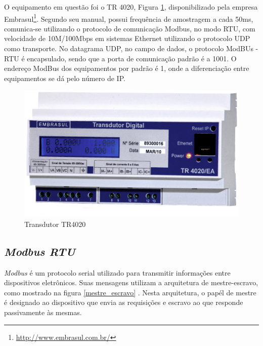 O equipamento em questão foi o TR 4020, Figura \ref{tr4020}, disponibilizado pela empresa Embrasul\footnote{\url{http://www.embrasul.com.br/}}. Segundo seu manual, possui frequência de amostragem a cada 50ms, comunica-se utilizando o protocolo de comunicação Modbus, no modo RTU, com velocidade de 10M/100Mbps em sistemas Ethernet utilizando o protocolo UDP como transporte. No datagrama UDP, no campo de dados, o protocolo ModBUs - RTU é encapsulado, sendo que a porta de comunicação padrão é a 1001. O endereço ModBus dos equipamentos por padrão é 1, onde a diferenciação entre equipamentos se dá pelo número de IP.

\begin{figure}[!h]
    \centering
    \includegraphics[keepaspectratio=true,scale=0.5]{figuras/tr4020.eps}
    \caption{Transdutor TR4020}
    \label{tr4020}
\end{figure}

    \subsection{\textit{Modbus RTU}}

    \textit{Modbus} é um protocolo serial utilizado para transmitir informações entre dispositivos eletrônicos. Suas mensagens utilizam a arquitetura de mestre-escravo, como mostrado na figura \ref{mestre_escravo} \cite{modbus}. Nesta arquitetura, o papél de mestre é designado ao dispositivo que envia as requisições e escravo ao que responde passivamente às mesmas.

